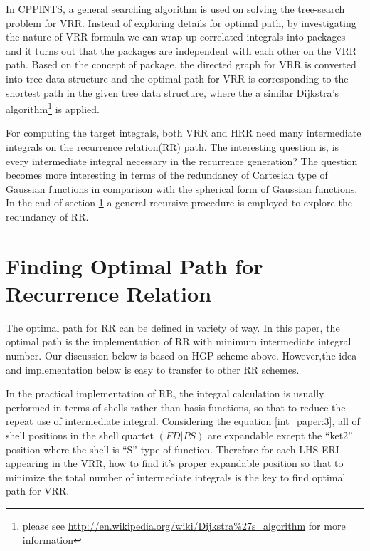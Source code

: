 In CPPINTS, a general searching algorithm is used on solving the tree-search problem for 
VRR. Instead of exploring details for optimal path, by
investigating the nature of VRR formula we can wrap up correlated integrals into packages
and it turns out that the packages are independent with each other on the VRR path. Based on
the concept of package, the directed graph for VRR is converted into tree data structure and the optimal
path for VRR is corresponding to the shortest path in the given tree data structure, where the
a similar Dijkstra's algorithm\footnote{please see 
\url{http://en.wikipedia.org/wiki/Dijkstra\%27s_algorithm} for more information} is applied.

For computing the target integrals, both VRR and HRR need many intermediate integrals on
the recurrence relation(RR) path. The interesting question is, is every intermediate integral 
necessary in the recurrence generation? The question becomes more interesting in terms of 
the redundancy of Cartesian type of Gaussian functions in comparison with the spherical form of 
Gaussian functions. In the end of section \ref{optimal_path} a general recursive procedure is 
employed to explore the redundancy of RR.


\section{Finding Optimal Path for Recurrence Relation}
\label{optimal_path}

The optimal path for RR can be defined in variety of way. In this paper,
the optimal path is the implementation of RR with minimum intermediate integral
number. Our discussion below is based on HGP scheme above. However,the idea 
and implementation below is easy to transfer to other RR schemes.

In the practical implementation of RR, the integral calculation is usually performed 
in terms of shells rather than basis functions, so that to reduce the repeat use of 
intermediate integral. Considering the equation \ref{int_paper:3}, 
all of shell positions in the shell quartet $(FD|PS)$ are expandable except the ``ket2'' position 
where the shell is ``S'' type of 
function. Therefore for each LHS ERI appearing in the VRR, how to find it's proper expandable
position so that to minimize the total number of intermediate integrals is the key to 
find optimal path for VRR.

